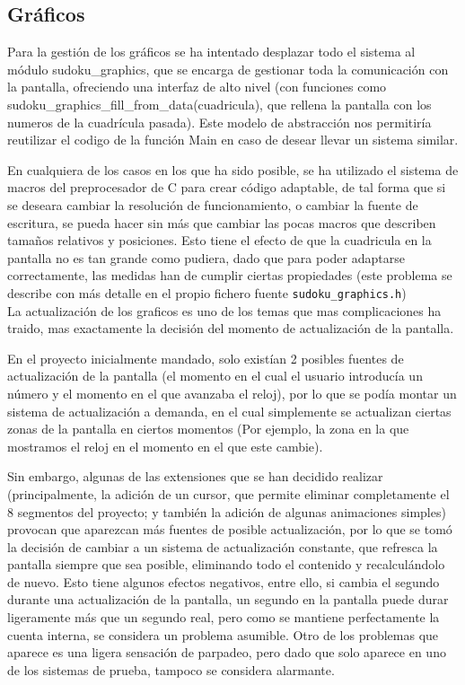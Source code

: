 \documentclass[12pt,letterpaper]{article}
\begin{document}
\subsection{Gráficos}
\label{subsec:graficos}
Para la gestión de los gráficos se ha intentado desplazar todo el
sistema al módulo sudoku\_graphics, que se encarga de gestionar toda
la comunicación con la pantalla, ofreciendo una interfaz de alto nivel
(con funciones como sudoku\_graphics\_fill\_from\_data(cuadricula),
que rellena la pantalla con los numeros de la cuadrícula pasada). Este
modelo de abstracción nos permitiría reutilizar el codigo de la
función Main en caso de desear llevar un sistema similar.

En cualquiera de los casos en los que ha sido posible, se ha utilizado
el sistema de macros del preprocesador de C para crear código
adaptable, de tal forma que si se deseara cambiar la resolución de
funcionamiento, o cambiar la fuente de escritura, se pueda hacer sin
más que cambiar las pocas macros que describen tamaños relativos y
posiciones. Esto tiene el efecto de que la cuadricula en la pantalla
no es tan grande como pudiera, dado que para poder adaptarse
correctamente, las medidas han de cumplir ciertas propiedades (este
problema se describe con más detalle en el propio fichero fuente
\texttt{sudoku\_graphics.h})\\

La actualización de los graficos es uno de los temas que mas
complicaciones ha traido, mas exactamente la decisión del momento de
actualización de la pantalla.

En el proyecto inicialmente mandado, solo existían 2 posibles fuentes
de actualización de la pantalla (el momento en el cual el usuario
introducía un número y el momento en el que avanzaba el reloj), por lo
que se podía montar un sistema de actualización a demanda, en el cual
simplemente se actualizan ciertas zonas de la pantalla en ciertos
momentos (Por ejemplo, la zona en la que mostramos el reloj en el
momento en el que este cambie).

Sin embargo, algunas de las extensiones que se han decidido realizar
(principalmente, la adición de un cursor, que permite eliminar
completamente el 8 segmentos del proyecto; y también la adición de
algunas animaciones simples) provocan que aparezcan más fuentes de
posible actualización, por lo que se tomó la decisión de cambiar a un
sistema de actualización constante, que refresca la pantalla siempre
que sea posible, eliminando todo el contenido y recalculándolo de
nuevo. Esto tiene algunos efectos negativos, entre ello, si cambia el
segundo durante una actualización de la pantalla, un segundo en la
pantalla puede durar ligeramente más que un segundo real, pero como se
mantiene perfectamente la cuenta interna, se considera un problema
asumible. Otro de los problemas que aparece es una ligera sensación de
parpadeo, pero dado que solo aparece en uno de los sistemas de prueba,
tampoco se considera alarmante.\\
\end{document}
